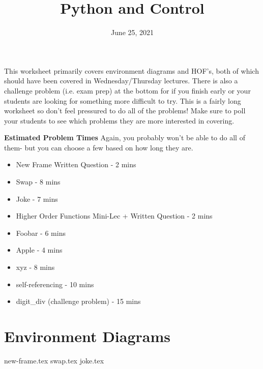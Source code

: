 \documentclass{exam}
\title{Python and Control}
\date{June 25, 2021}
\begin{document}
\maketitle


\begin{blocksection}
\begin{guide}
This worksheet primarily covers environment diagrams and HOF's, both of which should have been covered in Wednesday/Thursday lectures.
There is also a challenge problem (i.e. exam prep) at the bottom for if you finish early or your students are looking for something more difficult to try.
This is a fairly long worksheet so don't feel pressured to do all of the problems! Make sure to poll your students to see which problems they are more interested in covering.

\textbf{Estimated Problem Times}
\newline
Again, you probably won't be able to do all of them- but you can choose a few based on how long they are.
\begin{itemize}
    \item New Frame Written Question - 2 mins
    \item Swap - 8 mins
    \item Joke - 7 mins
    \item Higher Order Functions Mini-Lec + Written Question - 2 mins
    \item Foobar - 6 mins
    \item Apple - 4 mins
    \item xyz - 8 mins
    \item self-referencing - 10 mins
    \item digit\_div (challenge problem) - 15 mins
\end{itemize}
\end{guide}
\end{blocksection}


\section{Environment Diagrams}
\begin{questions}
{new-frame.tex}
{swap.tex}
\newpage
{joke.tex}
\end{questions}

\newpage
\end{document}
